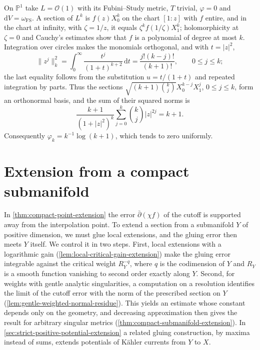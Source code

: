 \begin{example}\label{ex:projective-line-bergman-kernel}
On $\mathbb P^1$ take $L=\mathcal O(1)$ with its Fubini--Study metric, $T$ trivial, $\varphi=0$ and $\mathrm dV=\omega_{\mathrm{FS}}$. A section of $L^k$ is $f(z)X_0^k$ on the chart $[1:z]$ with $f$ entire, and in the chart at infinity, with $\zeta=1/z$, it equals $\zeta^kf(1/\zeta)X_1^k$; holomorphicity at $\zeta=0$ and Cauchy's estimates show that $f$ is a polynomial of degree at most $k$. Integration over circles makes the monomials orthogonal, and with $t=|z|^2$,
\[
 \|z^j\|_k^2=\int_0^\infty\frac{t^j}{(1+t)^{k+2}}\,\mathrm dt
       =\frac{j!(k-j)!}{(k+1)!},\qquad 0\leq j\leq k;
\]
the last equality follows from the substitution $u=t/(1+t)$ and repeated integration by parts. Thus the sections $\sqrt{(k+1)\binom{k}{j}}X_0^{k-j}X_1^j$, $0\leq j\leq k$, form an orthonormal basis, and the sum of their squared norms is
\[
 \frac{k+1}{(1+|z|^2)^k}\sum_{j=0}^k\binom{k}{j}|z|^{2j}=k+1.
\]
Consequently $\varphi_k=k^{-1}\log(k+1)$, which tends to zero uniformly.
\end{example}

\section{Extension from a compact submanifold}
\label{sec:compact-submanifold-extension}
In \cref{thm:compact-point-extension} the error $\bar\partial(\chi f)$ of the cutoff is supported away from the interpolation point. To extend a section from a submanifold $Y$ of positive dimension, we must glue local extensions, and the gluing error then meets $Y$ itself. We control it in two steps. First, local extensions with a logarithmic gain (\cref{lem:local-critical-gain-extension}) make the gluing error integrable against the critical weight $R_Y^{-q}$, where $q$ is the codimension of $Y$ and $R_Y$ is a smooth function vanishing to second order exactly along $Y$. Second, for weights with gentle analytic singularities, a computation on a resolution identifies the limit of the cutoff error with the norm of the prescribed section on $Y$ (\cref{lem:gentle-weighted-normal-residue}). This yields an estimate whose constant depends only on the geometry, and decreasing approximation then gives the result for arbitrary singular metrics (\cref{thm:compact-submanifold-extension}). In \cref{sec:strict-positive-potential-extension} a related gluing construction, by maxima instead of sums, extends potentials of K\"ahler currents from $Y$ to $X$.

